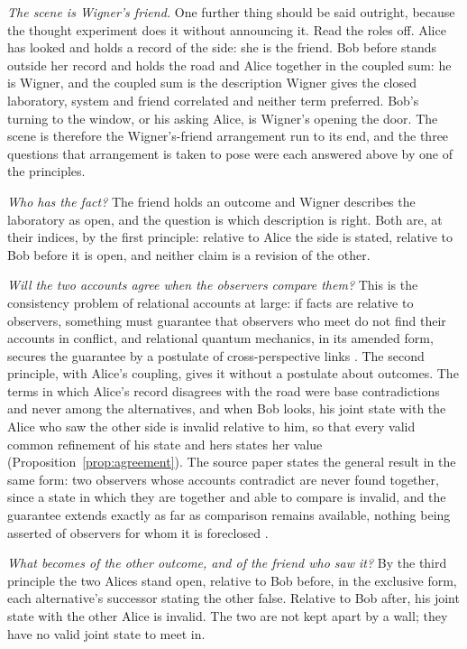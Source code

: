 \textit{The scene is Wigner's friend.} One further thing should be said outright, because the thought experiment does it without announcing it. Read the roles off. Alice has looked and holds a record of the side: she is the friend. Bob before stands outside her record and holds the road and Alice together in the coupled sum: he is Wigner, and the coupled sum is the description Wigner gives the closed laboratory, system and friend correlated and neither term preferred. Bob's turning to the window, or his asking Alice, is Wigner's opening the door. The scene is therefore the Wigner's-friend arrangement run to its end, and the three questions that arrangement is taken to pose were each answered above by one of the principles.

\emph{Who has the fact?} The friend holds an outcome and Wigner describes the laboratory as open, and the question is which description is right. Both are, at their indices, by the first principle: relative to Alice the side is stated, relative to Bob before it is open, and neither claim is a revision of the other.

\emph{Will the two accounts agree when the observers compare them?} This is the consistency problem of relational accounts at large: if facts are relative to observers, something must guarantee that observers who meet do not find their accounts in conflict, and relational quantum mechanics, in its amended form, secures the guarantee by a postulate of cross-perspective links \cite{rovelli1996relational, adlamrovelli2022}. The second principle, with Alice's coupling, gives it without a postulate about outcomes. The terms in which Alice's record disagrees with the road were base contradictions and never among the alternatives, and when Bob looks, his joint state with the Alice who saw the other side is invalid relative to him, so that every valid common refinement of his state and hers states her value (Proposition~\ref{prop:agreement}). The source paper states the general result in the same form: two observers whose accounts contradict are never found together, since a state in which they are together and able to compare is invalid, and the guarantee extends exactly as far as comparison remains available, nothing being asserted of observers for whom it is foreclosed \cite{Aethus}.

\emph{What becomes of the other outcome, and of the friend who saw it?} By the third principle the two Alices stand open, relative to Bob before, in the exclusive form, each alternative's successor stating the other false. Relative to Bob after, his joint state with the other Alice is invalid. The two are not kept apart by a wall; they have no valid joint state to meet in.

